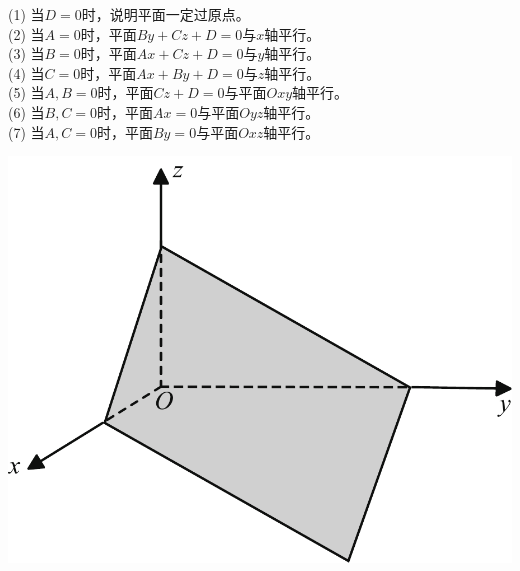 \vspace*{-1em}
\noindent
\begin{minipage}{0.6\linewidth}
\hspace*{2em}(1) \hspace*{0.5em}当$D=0$时，说明平面一定过原点。\\
\hspace*{2em}(2) \hspace*{0.5em}当$A=0$时，平面$By+Cz+D=0$与$x$轴平行。\\
\hspace*{2em}(3) \hspace*{0.5em}当$B=0$时，平面$Ax+Cz+D=0$与$y$轴平行。\\
\hspace*{2em}(4) \hspace*{0.5em}当$C=0$时，平面$Ax+By+D=0$与$z$轴平行。\\
\hspace*{2em}(5) \hspace*{0.5em}当$A,B=0$时，平面$Cz+D=0$与平面$Oxy$轴平行。\\
\hspace*{2em}(6) \hspace*{0.5em}当$B,C=0$时，平面$Ax=0$与平面$Oyz$轴平行。\\
\hspace*{2em}(7) \hspace*{0.5em}当$A,C=0$时，平面$By=0$与平面$Oxz$轴平行。\\
\end{minipage}
\begin{minipage}{0.4\linewidth}
	\centering
	\includegraphics[width = 0.8\linewidth]{pic/C-5/plane3}
	\vspace*{-1em}
	\label{平面的截距式方程}
\end{minipage}
